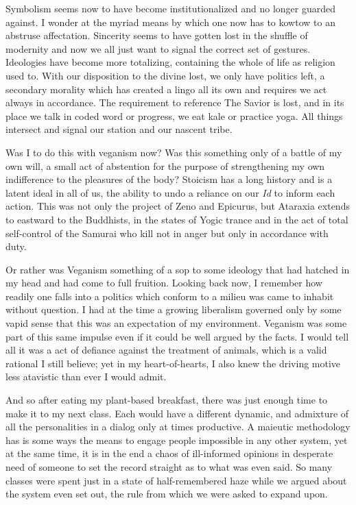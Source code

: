 \documentclass[ebook, 10pt, openright, onecolumn]{memoir}
\begin{document}
Symbolism seems now to have become institutionalized and no longer guarded
against.  I wonder at the myriad means by which one now has to kowtow to an
abstruse affectation.  Sincerity seems to have gotten lost in the shuffle of
modernity and now we all just want to signal the correct set of gestures.
Ideologies have become more totalizing, containing the whole of life as religion
used to.  With our disposition to the divine lost, we only have politics left, a
secondary morality which has created a lingo all its own and requires we act
always in accordance.  The requirement to reference The Savior is lost, and in
its place we talk in coded word or progress, we eat kale or practice yoga.  All
things intersect and signal our station and our nascent tribe.

Was I to do this with veganism now? Was this something only of a battle of my
own will, a small act of abstention for the purpose of strengthening my own
indifference to the pleasures of the body?  Stoicism has a long history and is a
latent ideal in all of us, the ability to undo a reliance on our \textit{Id} to
inform each action.  This was not only the project of Zeno and Epicurus, but
Ataraxia extends to eastward to the Buddhists, in the states of Yogic trance and
in the act of total self-control of the Samurai who kill not in anger but only
in accordance with duty.

Or rather was Veganism something of a sop to some ideology that had hatched in
my head and had come to full fruition.  Looking back now, I remember how readily
one falls into a politics which conform to a milieu was came to inhabit without
question.  I had at the time a growing liberalism governed only by some vapid
sense that this was an expectation of my environment.  Veganism was some part of
this same impulse even if it could be well argued by the facts.  I would tell
all it was a act of defiance against the treatment of animals, which is a valid
rational I still believe; yet in my heart-of-hearts, I also knew the driving
motive less atavistic than ever I would admit.

And so after eating my plant-based breakfast, there was just enough time to make
it to my next class.  Each would have a different dynamic, and admixture of all
the personalities in a dialog only at times productive.  A maieutic methodology
has is some ways the means to engage people impossible in any other system, yet
at the same time, it is in the end a chaos of ill-informed opinions in desperate
need of someone to set the record straight as to what was even said.  So many
classes were spent just in a state of half-remembered haze while we argued about
the system even set out, the rule from which we were asked to expand upon.
\end{document}
